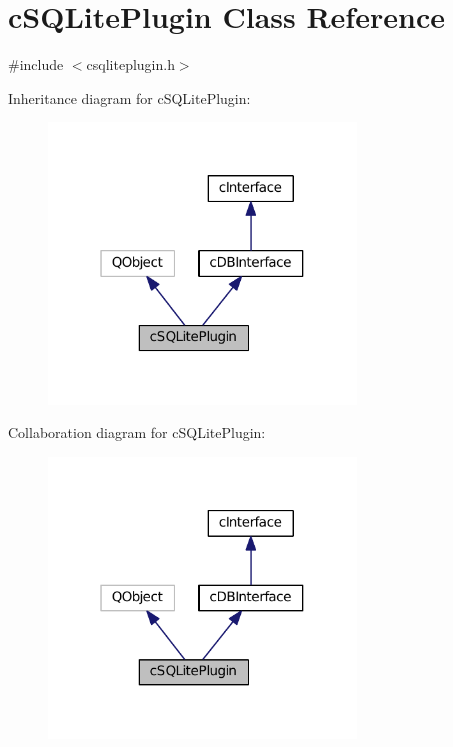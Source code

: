 \hypertarget{classc_s_q_lite_plugin}{}\section{c\+S\+Q\+Lite\+Plugin Class Reference}
\label{classc_s_q_lite_plugin}


{\ttfamily \#include $<$csqliteplugin.\+h$>$}



Inheritance diagram for c\+S\+Q\+Lite\+Plugin\+:
\nopagebreak
\begin{figure}[H]
\begin{center}
\leavevmode
\includegraphics[width=232pt]{classc_s_q_lite_plugin__inherit__graph}
\end{center}
\end{figure}


Collaboration diagram for c\+S\+Q\+Lite\+Plugin\+:
\nopagebreak
\begin{figure}[H]
\begin{center}
\leavevmode
\includegraphics[width=232pt]{classc_s_q_lite_plugin__coll__graph}
\end{center}
\end{figure}
